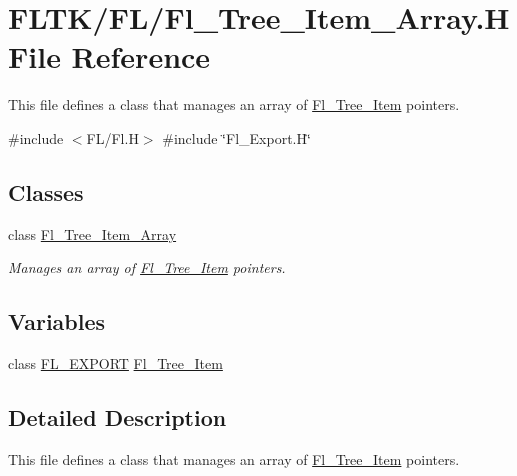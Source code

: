 \hypertarget{_fl___tree___item___array_8_h}{}\section{F\+L\+T\+K/\+F\+L/\+Fl\+\_\+\+Tree\+\_\+\+Item\+\_\+\+Array.H File Reference}
\label{_fl___tree___item___array_8_h}


This file defines a class that manages an array of \hyperlink{class_fl___tree___item}{Fl\+\_\+\+Tree\+\_\+\+Item} pointers.  


{\ttfamily \#include $<$F\+L/\+Fl.\+H$>$}\newline
{\ttfamily \#include \char`\"{}Fl\+\_\+\+Export.\+H\char`\"{}}\newline
\subsection*{Classes}
\begin{DoxyCompactItemize}
\item 
class \hyperlink{class_fl___tree___item___array}{Fl\+\_\+\+Tree\+\_\+\+Item\+\_\+\+Array}
\begin{DoxyCompactList}\small\item\em Manages an array of \hyperlink{class_fl___tree___item}{Fl\+\_\+\+Tree\+\_\+\+Item} pointers. \end{DoxyCompactList}\end{DoxyCompactItemize}
\subsection*{Variables}
\begin{DoxyCompactItemize}
\item 
class \hyperlink{_fl___export_8_h_aa9ba29a18aee9d738370a06eeb4470fc}{F\+L\+\_\+\+E\+X\+P\+O\+RT} \hyperlink{_fl___tree___item___array_8_h_af2703fb020caf780ee6735957b367dba}{Fl\+\_\+\+Tree\+\_\+\+Item}
\end{DoxyCompactItemize}


\subsection{Detailed Description}
This file defines a class that manages an array of \hyperlink{class_fl___tree___item}{Fl\+\_\+\+Tree\+\_\+\+Item} pointers. 




